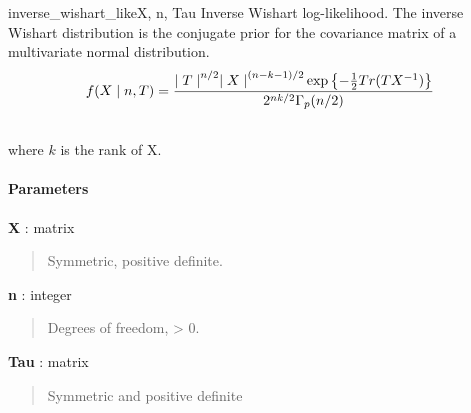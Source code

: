 \hypertarget{pymc.distributions.inverse_wishart_like}{}
\begin{funcdesc}{inverse\_wishart\_like}{X, n, Tau}
Inverse Wishart log-likelihood. The inverse Wishart distribution is the conjugate 
prior for the covariance matrix of a multivariate normal distribution.
\begin{gather}
\begin{split}f(X \mid n, T) = \frac{{\mid T \mid}^{n/2}{\mid X \mid}^{(n-k-1)/2} \exp\left\{ -\frac{1}{2} Tr(TX^{-1}) \right\}}{2^{nk/2} \Gamma_p(n/2)}\end{split}\notag\\\begin{split}\end{split}\notag
\end{gather}
where $k$ is the rank of X.
\paragraph{Parameters}\begin{paramlist}

\item[] \textbf{X} : matrix
\begin{quote}

Symmetric, positive definite.
\end{quote}

\item[] \textbf{n} : integer
\begin{quote}

Degrees of freedom, \textgreater{} 0.
\end{quote}

\item[] \textbf{Tau} : matrix
\begin{quote}

Symmetric and positive definite
\end{quote}
\end{paramlist}
\end{funcdesc}

